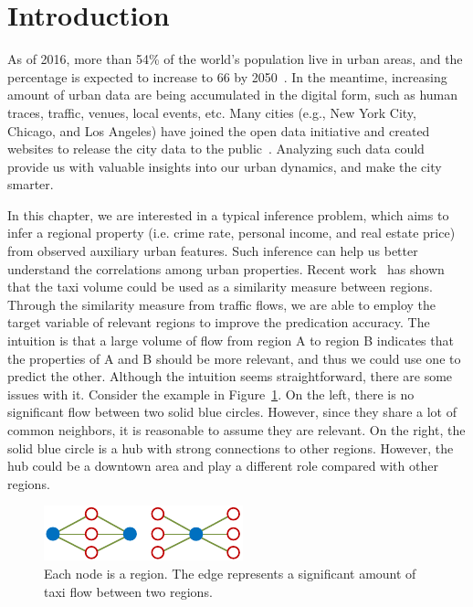 \section{Introduction}

As of 2016, more than 54\% of the world's population live in urban areas, and the percentage is expected to increase to 66 by 2050~\cite{nations2014world}. In the meantime, increasing amount of urban data are being accumulated in the digital form, such as human traces, traffic, venues, local events, etc. Many cities (e.g., New York City, Chicago, and Los Angeles) have joined the open data initiative and created websites to release the city data to the public~\cite{data-taxi, nyctaxi}. Analyzing such data could provide us with valuable insights into our urban dynamics, and make the city smarter.

In this chapter, we are interested in a typical inference problem, which aims to infer a regional property (i.e. crime rate, personal income, and real estate price) from observed auxiliary urban features. Such inference can help us better understand the correlations among urban properties. Recent work~\cite{wang2016crime} has shown that the taxi volume could be used as a similarity measure between regions. Through the similarity measure from traffic flows, we are able to employ the target variable of relevant regions to improve the predication accuracy. The intuition is that a large volume of flow from region A to region B indicates that the properties of A and B should be more relevant, and thus we could use one to predict the other. Although the intuition seems straightforward, there are some issues with it. Consider the example in Figure~\ref{fig:example}. On the left, there is no significant flow between two solid blue circles. However, since they share a lot of common neighbors, it is reasonable to assume they are relevant. On the right, the solid blue circle is a hub with strong connections to other regions. However, the hub could be a downtown area and play a different role compared with other regions.

\begin{figure}[h]
\centering
\includegraphics[width=0.5\linewidth]{fig/example.pdf}
\caption{Each node is a region. The edge represents a significant amount of taxi flow between two regions.}
\label{fig:example}
\end{figure}

